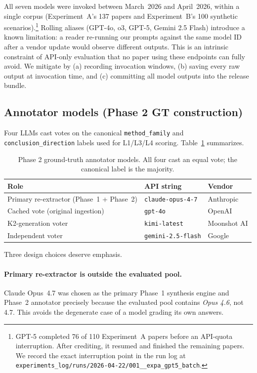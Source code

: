 All seven models were invoked between March~2026 and April~2026, within
a single corpus (Experiment~A's 137 papers and Experiment~B's 100
synthetic scenarios).\footnote{GPT-5 completed 76 of 110 Experiment~A
papers before an API-quota interruption. After crediting, it resumed
and finished the remaining papers. We record the exact interruption
point in the run log at
\texttt{experiments\_log/runs/2026-04-22/001\_\_expa\_gpt5\_batch}.}
Rolling aliases (GPT-4o, o3, GPT-5, Gemini 2.5 Flash) introduce a known
limitation: a reader re-running our prompts against the same model ID
after a vendor update would observe different outputs. This is an
intrinsic constraint of API-only evaluation that no paper using these
endpoints can fully avoid. We mitigate by (a) recording invocation
windows, (b) saving every raw output at invocation time, and
(c) committing all model outputs into the release bundle.

\subsection{Annotator models (Phase 2 GT construction)}

Four LLMs cast votes on the canonical \texttt{method\_family} and
\texttt{conclusion\_direction} labels used for L1/L3/L4 scoring.
Table~\ref{tab:annot-models} summarizes.

\begin{table}[h]
\centering
\small
\renewcommand{\arraystretch}{1.2}
\caption{Phase 2 ground-truth annotator models. All four cast an equal
vote; the canonical label is the majority.}
\label{tab:annot-models}
\begin{tabular}{lll}
\toprule
\textbf{Role} & \textbf{API string} & \textbf{Vendor} \\
\midrule
Primary re-extractor (Phase~1 + Phase~2)  & \texttt{claude-opus-4-7} & Anthropic \\
Cached vote (original ingestion)          & \texttt{gpt-4o}          & OpenAI    \\
K2-generation voter                        & \texttt{kimi-latest}     & Moonshot AI \\
Independent voter                          & \texttt{gemini-2.5-flash}& Google    \\
\bottomrule
\end{tabular}
\end{table}

Three design choices deserve emphasis.

\paragraph{Primary re-extractor is outside the evaluated pool.}
Claude Opus~4.7 was chosen as the primary Phase~1 synthesis engine and
Phase~2 annotator precisely because the evaluated pool contains
\emph{Opus 4.6}, not 4.7. This avoids the degenerate case of a model
grading its own answers.

